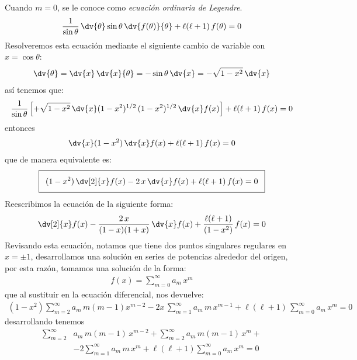 Cuando $m = 0$, se le conoce como \emph{ecuación ordinaria de Legendre}.
\begin{align*}
\dfrac{1}{\sin \theta} \, \dv{\theta} \sin \theta \, \dv{f(\theta)}{\theta} + \ell (\ell + 1) \, f(\theta) = 0
\end{align*}
Resolveremos esta ecuación mediante el siguiente cambio de variable con $x = \cos \theta$:
\begin{align*}
\dv{\theta} = \dv{x} \, \dv{x}{\theta} = - \sin \theta \, \dv{x} = - \sqrt{1 - x^{2}} \, \dv{x}
\end{align*}
así tenemos que:
\begin{align*}
\dfrac{1}{\sin \theta} \left[ + \sqrt{1 -x^{2}} \, \dv{x} (1 - x^{2})^{1/2} \, (1 - x^{2})^{1/2} \, \dv{x} f(x) \right] + \ell (\ell + 1) \, f(x) = 0
\end{align*}
entonces
\begin{align*}
\dv{x} (1 - x^{2}) \, \dv{x} f(x) + \ell (\ell + 1) \, f(x) = 0
\end{align*}
que de manera equivalente es:
\begin{align*}
\addtolength{\fboxsep}{5pt}\boxed{
(1 - x^{2}) \, \dv[2]{x} f(x) - 2 \, x \, \dv{x} f(x) + \ell (\ell + 1) \, f(x) = 0}
\end{align*}
Reescribimos la ecuación de la siguiente forma:
\begin{align*}
\dv[2]{x} f(x) - \dfrac{2 \, x}{(1 - x)(1 + x)} \, \dv{x} f(x) + \dfrac{\ell (\ell + 1)}{(1 - x^{2})} \, f(x) = 0
\end{align*}
Revisando esta ecuación, notamos que tiene dos puntos singulares regulares en $x = \pm 1$, desarrollamos una solución en series de potencias alrededor del origen, por esta razón, tomamos una solución de la forma:
\begin{align*}
f(x) = \sum_{m=0}^{\infty} a_{m} \, x^{m}
\end{align*}
que al sustituir en la ecuación diferencial, nos devuelve:
\begin{align*}
(1 - x^{2}) \sum_{m=2}^{\infty} a_{m} \, m( m - 1)  x^{m-2} -  2 x \, \sum_{m=1}^{\infty} a_{m} \, m \, x^{m-1} + \ell (\ell + 1) \, \sum_{m=0}^{\infty} a_{m} \, x^{m} = 0
\end{align*}
desarrollando tenemos
\begin{align*}
\sum_{m=2}^{\infty} &a_{m} \, m (m - 1) \, x^{m-2} + \sum_{m=2}^{\infty} a_{m} \, m (m - 1) \, x^{m} + \\[0.5em]
&- 2 \sum_{m=1}^{\infty} a_{m} \, m \, x^{m} + \ell (\ell + 1) \sum_{m=0}^{\infty} a_{m} \, x^{m} = 0
\end{align*}
